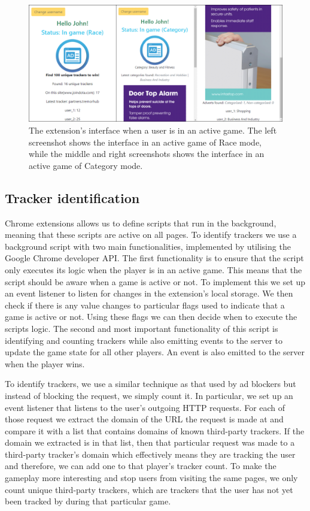 \documentclass{l4proj}
\begin{document}
\begin{figure}
    \centering
    \includegraphics[width=1\linewidth]{images/ext.png}    

    \caption{The extension's interface when a user is in an active game. The left screenshot shows the interface in an active game of Race mode, while the middle and right screenshots shows the interface in an active game of Category mode.}

    \label{fig:ext} 
\end{figure}

\subsection{Tracker identification}
Chrome extensions allows us to define scripts that run in the background, meaning that these scripts are active on all pages. To identify trackers we use a background script with two main functionalities, implemented by utilising the Google Chrome developer API. The first functionality is to ensure that the script only executes its logic when the player is in an active game. This means that the script should be aware when a game is active or not. To implement this we set up an event listener to listen for changes in the extension's local storage. We then check if there is any value changes to particular flags used to indicate that a game is active or not. Using these flags we can then decide when to execute the scripts logic. The second and most important functionality of this script is identifying and counting trackers while also emitting events to the server to update the game state for all other players. An event is also emitted to the server when the player wins. 

To identify trackers, we use a similar technique as that used by ad blockers but instead of blocking the request, we simply count it. In particular, we set up an event listener that listens to the user's outgoing HTTP requests. For each of those request we extract the domain of the URL the request is made at and compare it with a list that contains domains of known third-party trackers. If the domain we extracted is in that list, then that particular request was made to a third-party tracker's domain which effectively means they are tracking the user and therefore, we can add one to that player's tracker count. To make the gameplay more interesting and stop users from visiting the same pages, we only count unique third-party trackers, which are trackers that the user has not yet been tracked by during that particular game.
\end{document}
